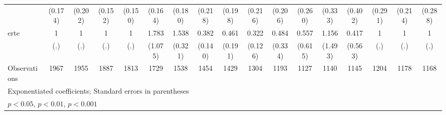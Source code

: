 {\begin{tabular}{l*{16}{c}}
                    &     (0.174)         &     (0.202)         &     (0.152)         &     (0.150)         &     (0.164)         &     (0.180)         &     (0.218)         &     (0.198)         &     (0.216)         &     (0.206)         &     (0.260)         &     (0.333)         &     (0.402)         &     (0.291)         &     (0.214)         &     (0.288)         \\
[1em]
erte                &           1         &           1         &           1         &           1         &       1.783         &       1.538\sym{*}  &       0.382\sym{**} &       0.461         &       0.322\sym{**} &       0.484         &       0.557         &       1.156         &       0.417         &           1         &           1         &           1         \\
                    &         (.)         &         (.)         &         (.)         &         (.)         &     (1.075)         &     (0.321)         &     (0.140)         &     (0.191)         &     (0.126)         &     (0.334)         &     (0.615)         &     (1.493)         &     (0.563)         &         (.)         &         (.)         &         (.)         \\
\hline
Observations        &        1967         &        1955         &        1887         &        1813         &        1729         &        1538         &        1454         &        1429         &        1304         &        1193         &        1127         &        1140         &        1145         &        1204         &        1178         &        1168         \\
\hline\hline
\multicolumn{17}{l}{\footnotesize Exponentiated coefficients; Standard errors in parentheses}\\
\multicolumn{17}{l}{\footnotesize \sym{*} \(p<0.05\), \sym{**} \(p<0.01\), \sym{***} \(p<0.001\)}\\
\end{tabular}
}
